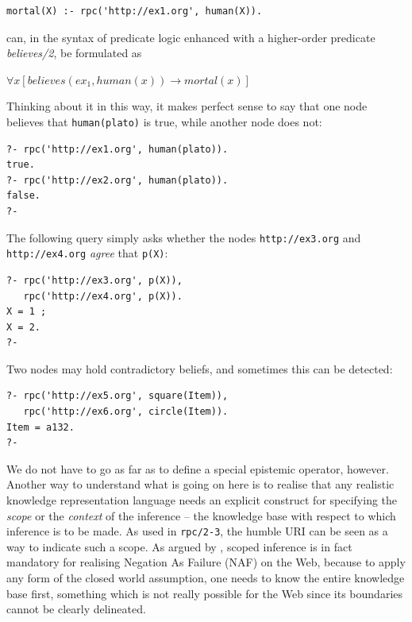 \documentclass{tlp}
\begin{document}
\begin{lstlisting}
mortal(X) :- rpc('http://ex1.org', human(X)).
\end{lstlisting}

\noindent can, in the syntax of predicate logic enhanced with a higher-order predicate \textit{believes/2}, be formulated as

\begin{center}
$\forall x [believes(ex_1, human(x)) \rightarrow mortal(x)]$
\end{center}

\noindent Thinking about it in this way, it makes perfect sense to say that one node believes that \texttt{human(plato)} is true, while another node does not:

\begin{lstlisting}
?- rpc('http://ex1.org', human(plato)).
true.
?- rpc('http://ex2.org', human(plato)).
false.
?-
\end{lstlisting}

\noindent The following query simply asks whether the nodes \texttt{http://ex3.org} and \texttt{http://ex4.org} \textit{agree} that \texttt{p(X)}:

\begin{lstlisting}
?- rpc('http://ex3.org', p(X)), 
   rpc('http://ex4.org', p(X)).
X = 1 ;
X = 2.
?-
\end{lstlisting}

\noindent Two nodes may hold contradictory beliefs, and sometimes this can be detected: 

\begin{lstlisting}
?- rpc('http://ex5.org', square(Item)), 
   rpc('http://ex6.org', circle(Item)).
Item = a132.
?-
\end{lstlisting}


\noindent We do not have to go as far as to define a special epistemic operator, however. Another way to understand what is going on here is to realise that any realistic knowledge representation language needs an explicit construct for specifying the \textit{scope} or the \textit{context} of the inference -- the knowledge base with respect to which inference is to be made. As used in \texttt{rpc/2-3}, the humble URI can be seen as a way to indicate such a scope. As argued by \cite{Kifer2005}, scoped inference is in fact mandatory for realising Negation As Failure (NAF) on the Web, because to apply any form of the closed world assumption, one needs to know the entire knowledge base first, something which is not really possible for the Web since its boundaries cannot be clearly delineated.
\end{document}
